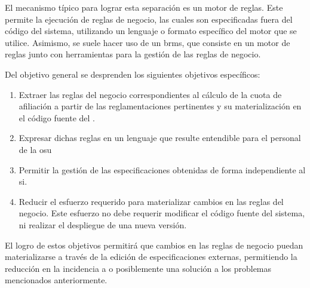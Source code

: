 El mecanismo típico para lograr esta separación es un motor de reglas. Este permite la ejecución de reglas de negocio, las cuales son especificadas fuera del código del sistema, utilizando un lenguaje o formato específico del motor que se utilice.
Asimismo, se suele hacer uso de un \acrfull{brms}, que consiste en un motor de reglas junto con herramientas para la gestión de las reglas de negocio.

Del objetivo general se desprenden los siguientes objetivos específicos:
%
\begin{enumerate}

    \item 
    Extraer las reglas del negocio correspondientes al cálculo de la cuota de afiliación a partir de las reglamentaciones pertinentes y su materialización en el código fuente del {\SIDOSPU}.
    \item 
    \label{obj:esp:intelegible}
    Expresar dichas reglas en un lenguaje que resulte entendible para el personal de la \acrlong{osu}
    \item
    \label{obj:esp:independiente}
    Permitir la gestión de las especificaciones obtenidas de forma independiente al \acrshort{si}.
    \item Reducir el esfuerzo requerido para materializar cambios en las reglas del negocio. Este esfuerzo no debe requerir modificar el código fuente del sistema, ni realizar el despliegue de una nueva versión.
\end{enumerate}

El logro de estos objetivos permitirá que cambios en las reglas de negocio puedan materializarse a través de la edición de especificaciones externas,  permitiendo la reducción en la incidencia a o posiblemente una solución a los problemas mencionados anteriormente.

